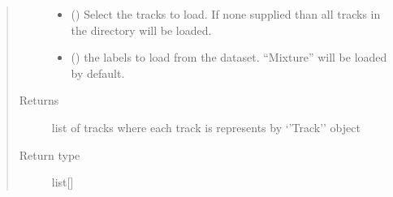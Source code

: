 \documentclass[letterpaper,10pt,english]{sphinxmanual}
\begin{document}
\begin{fulllineitems}
\begin{fulllineitems}
\begin{quote}
\begin{description}
\begin{itemize}
\item {} 
 (\sphinxstyleliteralemphasis{\sphinxupquote{{[}}}\sphinxstyleliteralemphasis{\sphinxupquote{{]}}}\sphinxstyleliteralemphasis{\sphinxupquote{, }}) \textendash{} Select the tracks to load.
If none supplied than all tracks in the directory will be loaded.

\item {} 
 () \textendash{} the labels to load from the dataset.
“Mixture” will be loaded by default.

\end{itemize}

\item[{Returns}] \leavevmode
list of tracks where each track is represents by ‘’Track’’ object

\item[{Return type}] \leavevmode
list{[}{\hyperref[\detokenize{docs/source/application.model:application.model.Track}]{}}{]}

\end{description}\end{quote}

\end{fulllineitems}


\end{fulllineitems}
\end{document}
